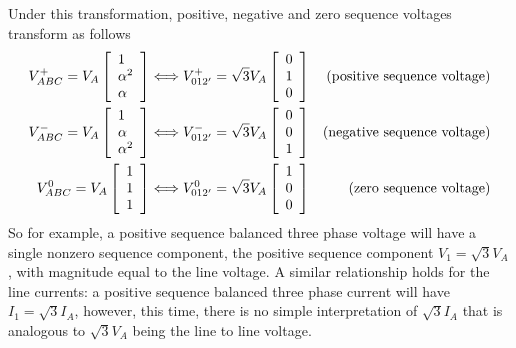 \documentclass[10pt]{article}
\begin{document}
Under this transformation, positive, negative and zero sequence voltages transform as follows
\begin{align}
V_{ABC}^+ = V_A\left[\begin{array}{l} 
	1 \\ \alpha^2 \\ \alpha 
\end{array}\right] &\Longleftrightarrow 
V_{012'}^+ = \sqrt{3}V_A\left[\begin{array}{l} 
	0 \\ 1 \\ 0
\end{array}\right] & \text{(positive sequence voltage)}\notag \\
V_{ABC}^- = V_A\left[\begin{array}{l} 
	1 \\ \alpha \\ \alpha^2
\end{array}\right] &\Longleftrightarrow 
V_{012'}^- = \sqrt{3}V_A\left[\begin{array}{l} 
	0 \\ 0 \\ 1
\end{array}\right] & \text{(negative sequence voltage)}\notag \\
V_{ABC}^0 = V_A\left[\begin{array}{l} 
	1 \\ 1 \\ 1
\end{array}\right] &\Longleftrightarrow 
V_{012'}^0 = \sqrt{3}V_A\left[\begin{array}{l} 
	1 \\ 0 \\ 0
\end{array}\right] & \text{(zero sequence voltage)}\notag \\
\end{align}
So for example, a positive sequence balanced three phase voltage will have a single nonzero sequence component, the positive sequence component $V_1 = \sqrt{3}V_A$, with magnitude equal to the line voltage. A similar relationship holds for the line currents: a positive sequence balanced three phase current will have $I_1 = \sqrt{3}I_A$, however, this time, there is no simple interpretation of $\sqrt{3}I_A$ that is analogous to $\sqrt{3}V_A$ being the line to line voltage.
\end{document}

